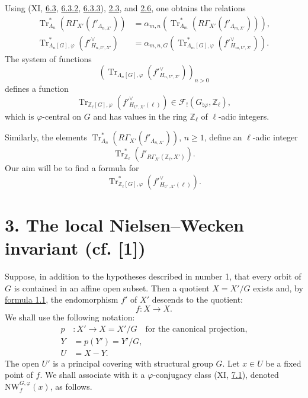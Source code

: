 \documentclass[11pt]{article}
\providecommand{\Tr}{\operatorname{Tr}}
\providecommand{\Tr}{\operatorname{Tr}}
\providecommand{\Tr}{\operatorname{Tr}}
\providecommand{\Tr}{\operatorname{Tr}}
\providecommand{\La}{\Lambda}
\providecommand{\bZ}{\mathbb Z}
\providecommand{\Tr}{\operatorname{Tr}}
\begin{document}
Using (XI, \hyperref[sga5:XII:subsection:6.3]{6.3}, \hyperref[sga5:XII:equation:6.3.2]{6.3.2}, \hyperref[sga5:XII:equation:6.3.3]{6.3.3}), \hyperref[sga5:XII:equation:2.3]{2.3}, and \hyperref[sga5:XII:equation:2.6]{2.6}, one obtains the relations
\begin{align}
\tag{2.7}\label{sga5:XII:equation:2.7}\Tr^*_{\La_n}(R\Gamma_{X'}(f'_{\La_{n,X'}}))&=\alpha_{m,n}(\Tr^*_{\La_m}(R\Gamma_{X'}(f'_{\La_{m,X'}}))),\\
\tag{2.8}\label{sga5:XII:equation:2.8}\Tr^*_{\La_n[G],\varphi}(f'^\vee_{H_{n,U',X'}})&=\alpha_{m,n,G}(\Tr^*_{\La_m[G],\varphi}(f'^\vee_{H_{m,U',X'}})).
\end{align}
The system of functions
\[
(\Tr_{\La_n[G],\varphi}(f'^\vee_{H_{n,U',X'}}))_{n>0}
\]
defines a function
\[
\Tr_{\bZ_\ell[G],\varphi}(f'^\vee_{H_{U',X'}(\ell)})
\in \mathcal F_!(G_{\natural\varphi},\bZ_\ell),
\]
which is $\varphi$-central on $G$ and has values in the ring $\bZ_\ell$ of $\ell$-adic integers.

Similarly, the elements $\Tr^*_{\La_n}(R\Gamma_{X'}(f'_{\La_{n,X'}}))$, $n\ge1$, define an $\ell$-adic integer
\[
\Tr^*_{\bZ_\ell}(f'_{R\Gamma_{X'}(\bZ_\ell,X')}).
\]
Our aim will be to find a formula for
\[
\Tr^*_{\bZ_\ell[G],\varphi}(f'^\vee_{H_{U',X'}(\ell)}).
\]

\section*{3. The local Nielsen--Wecken invariant (cf. [1])}\label{sga5:XII:section:3}
Suppose, in addition to the hypotheses described in number 1, that every orbit of $G$ is contained in an affine open subset. Then a quotient $X=X'/G$ exists and, by \hyperref[sga5:XII:equation:1.1]{formula 1.1}, the endomorphism $f'$ of $X'$ descends to the quotient:
\[
f:X\longrightarrow X .
\]
We shall use the following notation:
\begin{align*}
p &: X'\longrightarrow X=X'/G\quad \text{for the canonical projection,}\\
Y&=p(Y')=Y'/G,\\
U&=X-Y.
\end{align*}
The open $U'$ is a principal covering with structural group $G$. Let $x\in U$ be a fixed point of $f$. We shall associate with it a $\varphi$-conjugacy class (XI, \hyperref[sga5:XII:subsection:7.1]{7.1}), denoted $\mathrm{NW}_{f}^{G,\varphi}(x)$, as follows.
\end{document}
